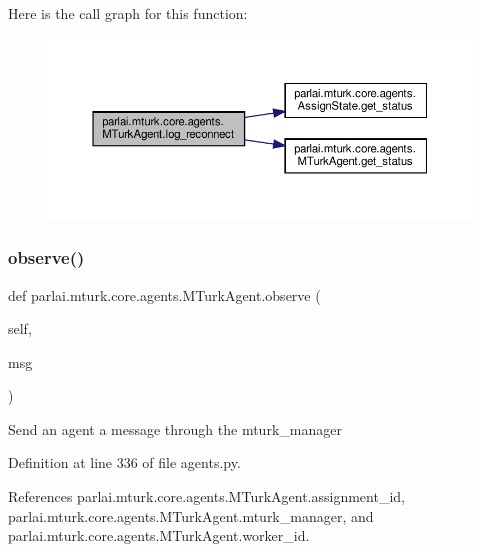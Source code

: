 Here is the call graph for this function\+:
\nopagebreak
\begin{figure}[H]
\begin{center}
\leavevmode
\includegraphics[width=350pt]{classparlai_1_1mturk_1_1core_1_1agents_1_1MTurkAgent_a989a5ebbfea27129167087af818e4f6d_cgraph}
\end{center}
\end{figure}
\mbox{\label{classparlai_1_1mturk_1_1core_1_1agents_1_1MTurkAgent_a702f94fe519f05bc8fb9b382b818112c}} 
\subsubsection{\texorpdfstring{observe()}{observe()}}
{\footnotesize\ttfamily def parlai.\+mturk.\+core.\+agents.\+M\+Turk\+Agent.\+observe (\begin{DoxyParamCaption}\item[{}]{self,  }\item[{}]{msg }\end{DoxyParamCaption})}

\begin{DoxyVerb}Send an agent a message through the mturk_manager\end{DoxyVerb}
 

Definition at line 336 of file agents.\+py.



References parlai.\+mturk.\+core.\+agents.\+M\+Turk\+Agent.\+assignment\+\_\+id, parlai.\+mturk.\+core.\+agents.\+M\+Turk\+Agent.\+mturk\+\_\+manager, and parlai.\+mturk.\+core.\+agents.\+M\+Turk\+Agent.\+worker\+\_\+id.

\mbox{\label{classparlai_1_1mturk_1_1core_1_1agents_1_1MTurkAgent_afdcfa4b074f379039112935c65463a40}} 
